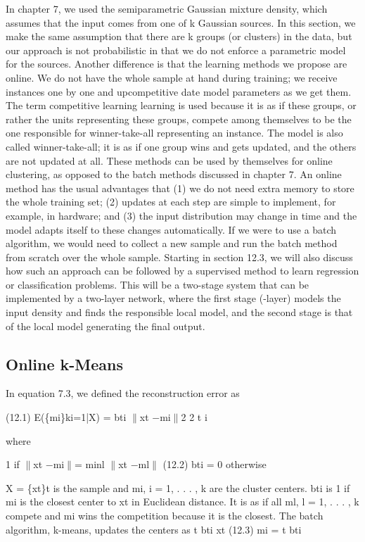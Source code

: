 In chapter 7, we used the semiparametric Gaussian mixture density, which assumes that the input comes from one of k Gaussian sources. In this section, we make the same assumption that there are k groups (or clusters) in the data, but our approach is not probabilistic in that we do not enforce a parametric model for the sources. Another difference is that the learning methods we propose are online. We do not have the whole sample at hand during training; we receive instances one by one and upcompetitive date model parameters as we get them. The term competitive learning learning is used because it is as if these groups, or rather the units representing these groups, compete among themselves to be the one responsible for winner-take-all representing an instance. The model is also called winner-take-all; it is as if one group wins and gets updated, and the others are not updated at all. These methods can be used by themselves for online clustering, as opposed to the batch methods discussed in chapter 7. An online method has the usual advantages that (1) we do not need extra memory to store the whole training set; (2) updates at each step are simple to implement, for example, in hardware; and (3) the input distribution may change in time and the model adapts itself to these changes automatically. If we were to use a batch algorithm, we would need to collect a new sample and run the batch method from scratch over the whole sample. Starting in section 12.3, we will also discuss how such an approach can be followed by a supervised method to learn regression or classification problems. This will be a two-stage system that can be implemented by a two-layer network, where the first stage (-layer) models the input density and finds the responsible local model, and the second stage is that of the local model generating the final output.

\subsection{Online k-Means}

In equation 7.3, we defined the reconstruction error as

(12.1) E(\{mi\}ki=1|X) = bti $\parallel$xt $-$mi$\parallel$2 2 t i

where

1 if $\parallel$xt $-$mi$\parallel$= minl $\parallel$xt $-$ml$\parallel$ (12.2) bti = 0 otherwise

X = \{xt\}t is the sample and mi, i = 1, . . . , k are the cluster centers. bti is 1 if mi is the closest center to xt in Euclidean distance. It is as if all ml, l = 1, . . . , k compete and mi wins the competition because it is the closest. The batch algorithm, k-means, updates the centers as t bti xt (12.3) mi = t bti

